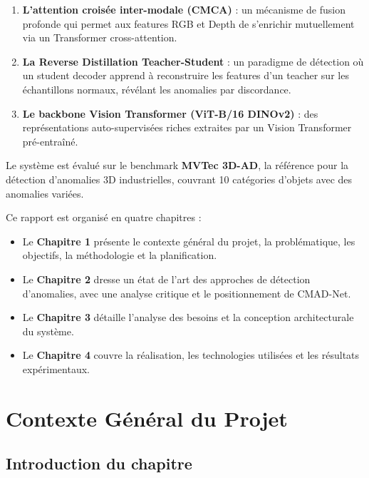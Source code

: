 \documentclass[12pt,a4paper,oneside]{report}
\begin{document}
\begin{enumerate}
    \item \textbf{L'attention croisée inter-modale (CMCA)} : un mécanisme de fusion profonde qui permet aux features RGB et Depth de s'enrichir mutuellement via un Transformer cross-attention.
    \item \textbf{La Reverse Distillation Teacher-Student} : un paradigme de détection où un student decoder apprend à reconstruire les features d'un teacher sur les échantillons normaux, révélant les anomalies par discordance.
    \item \textbf{Le backbone Vision Transformer (ViT-B/16 DINOv2)} : des représentations auto-supervisées riches extraites par un Vision Transformer pré-entraîné.
\end{enumerate}

Le système est évalué sur le benchmark \textbf{MVTec 3D-AD}, la référence pour la détection d'anomalies 3D industrielles, couvrant 10 catégories d'objets avec des anomalies variées.

Ce rapport est organisé en quatre chapitres :
\begin{itemize}
    \item Le \textbf{Chapitre 1} présente le contexte général du projet, la problématique, les objectifs, la méthodologie et la planification.
    \item Le \textbf{Chapitre 2} dresse un état de l'art des approches de détection d'anomalies, avec une analyse critique et le positionnement de CMAD-Net.
    \item Le \textbf{Chapitre 3} détaille l'analyse des besoins et la conception architecturale du système.
    \item Le \textbf{Chapitre 4} couvre la réalisation, les technologies utilisées et les résultats expérimentaux.
\end{itemize}


\chapter{Contexte Général du Projet}

\section*{Introduction du chapitre}
\end{document}
